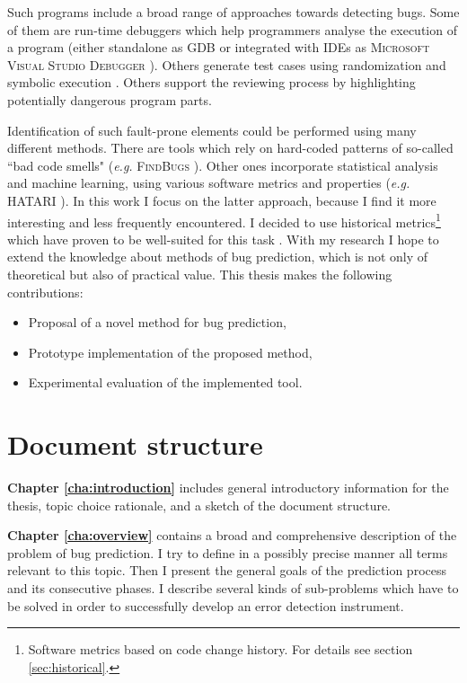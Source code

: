 \documentclass{pracamgr}
\begin{document}
Such programs include a broad range of approaches towards detecting bugs. Some of them are run-time debuggers which help programmers analyse the execution of a program (either standalone as GDB \cite{gdb} or integrated with IDEs as \textsc{Microsoft Visual Studio Debugger} \cite{vs_debugger}). Others generate test cases using randomization and symbolic execution \cite{symbolic, puzzle}. Others support the reviewing process by highlighting potentially dangerous program parts.

Identification of such fault-prone elements could be performed using many different methods. There are tools which rely on hard-coded patterns of so-called ``bad code smells" (\textit{e.g.} \textsc{FindBugs} \cite{findbugs}). Other ones incorporate statistical analysis and machine learning, using various software metrics and properties (\textit{e.g.} HATARI \cite{hatari}). In this work I focus on the latter approach, because I find it more interesting and less frequently encountered. I decided to use historical metrics\footnote{Software metrics based on code change history. For details see section \ref{sec:historical}.} which have proven to be well-suited for this task \cite{merits, comparative, how_and_why}. With my research I hope to extend the knowledge about methods of bug prediction, which is not only of theoretical but also of practical value. This thesis makes the following contributions:
\begin{itemize}
	\item Proposal of a novel method for bug prediction,
	\item Prototype implementation of the proposed method,
	\item Experimental evaluation of the implemented tool.
\end{itemize}

\section{Document structure}
\label{sec:structure}

\textbf{Chapter \ref{cha:introduction}} includes general introductory information for the thesis, topic choice rationale, and a sketch of the document structure. 

\medskip \noindent
\textbf{Chapter \ref{cha:overview}} contains a broad and comprehensive description of the problem of bug prediction. I try to define in a possibly precise manner all terms relevant to this topic. Then I present the general goals of the prediction process and its consecutive phases. I describe several kinds of sub-problems which have to be solved in order to successfully develop an error detection instrument.
\end{document}
